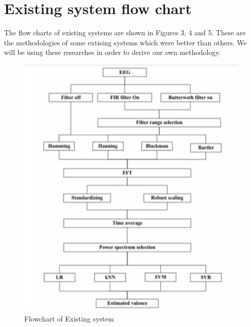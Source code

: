 \documentclass[a4paper, 12pt, oneside]{uet_thesis}
\begin{document}
\section{Existing system flow chart}
The flow charts of existing systems are shown in Figures 3, 4 and 5. These are the methodologies of some extising systems which were better than others. We will be using these researches in order to derive our own methodology.
\begin{figure}[htbp]
\centerline{\includegraphics[scale=0.8]{Existing1.png}}
\caption{Flowchart of Existing system  \cite{b1}}
\label{Table4}
\end{figure}
\end{document}
